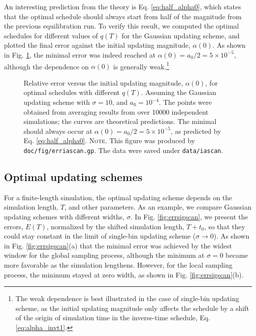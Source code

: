 \documentclass[preprint, floatfix]{revtex4-1}
\newcommand{\note}[1]{{\color{DarkGreen}\footnotesize \textsc{Note.} #1}}
\newcommand{\Err}{E}
\begin{document}
An interesting prediction from the theory is Eq. \eqref{eq:half_alpha0},
which states that the optimal schedule should always start from
half of the magnitude from the previous equilibration run.
%
To verify this result,
we computed the optimal schedules
for different values of $q(T)$
for the Gaussian updating scheme,
and plotted the final error
against the initial updating magnitude, $\alpha(0)$.
%
As shown in Fig. \ref{fig:erriascan},
the minimal error was indeed reached at
$\alpha(0) = a_0/2 = 5 \times 10^{-5}$,
although the dependence on $\alpha(0)$
is generally weak.\footnote{The weak dependence is best illustrated in
the case of single-bin updating scheme,
as the initial updating magnitude only
affects the schedule by a shift of the origin of
simulation time in the inverse-time schedule,
Eq. \eqref{eq:alpha_invt1}.}


\begin{figure}[h]
\begin{center}
  \caption{
    \label{fig:erriascan}
    Relative error
    versus the initial updating magnitude, $\alpha(0)$,
    for optimal schedules with different $q(T)$.
    Assuming the Gaussian updating scheme
    with $\sigma = 10$,
    and $a_0 = 10^{-4}$.
    The points were obtained from averaging results
    from over 10000 independent simulations;
    the curves are theoretical predictions.
    The minimal should always occur at
    $\alpha(0) = a_0/2 = 5 \times 10^{-5}$,
    as predicted by Eq. \eqref{eq:half_alpha0}.
    \note{This figure was produced by
      \texttt{doc/fig/erriascan.gp}.
      The data were saved under
      \texttt{data/iascan}.
    }%
  }
\end{center}
\end{figure}






\subsection{\label{sec:results_cmpschemes}
Optimal updating schemes}



For a finite-length simulation,
the optimal updating scheme
depends on the simulation length, $T$,
and other parameters.
%
As an example,
we compare Gaussian updating schemes
with different widths, $\sigma$.
%
In Fig. \ref{fig:errsigscan},
we present the errors, $\Err(T)$,
normalized by the shifted simulation length, $T+t_0$,
so that they could
stay constant in the limit of single-bin updating scheme
($\sigma \to 0$).
%
As shown in Fig. \ref{fig:errsigscan}(a)
that the minimal error was achieved
by the widest window %
for the global sampling process,
%
although
the minimum at $\sigma = 0$ became more favorable
as the simulation lengthens.
%
However,
for the local sampling process,
the minimum stayed at zero width,
as shown in Fig. \ref{fig:errsigscan}(b).
\end{document}

